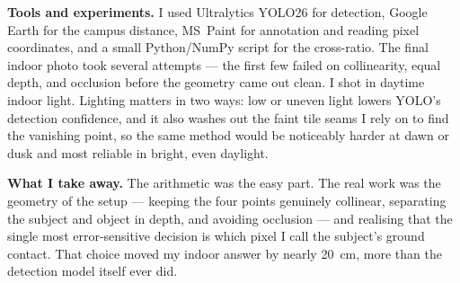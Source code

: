 \begin{studentSpace}
\textbf{Tools and experiments.} I used Ultralytics YOLO26 for detection,
Google Earth for the campus distance, MS~Paint for annotation and reading
pixel coordinates, and a small Python/NumPy script for the cross-ratio.
The final indoor photo took several attempts --- the first few failed on
collinearity, equal depth, and occlusion before the geometry came out
clean. I shot in daytime indoor light. Lighting matters in two ways: low
or uneven light lowers YOLO's detection confidence, and it also washes out
the faint tile seams I rely on to find the vanishing point, so the same
method would be noticeably harder at dawn or dusk and most reliable in
bright, even daylight.

\textbf{What I take away.} The arithmetic was the easy part. The real work
was the geometry of the setup --- keeping the four points genuinely
collinear, separating the subject and object in depth, and avoiding
occlusion --- and realising that the single most error-sensitive decision
is which pixel I call the subject's ground contact. That choice moved my
indoor answer by nearly 20~cm, more than the detection model itself ever
did.
\end{studentSpace}


